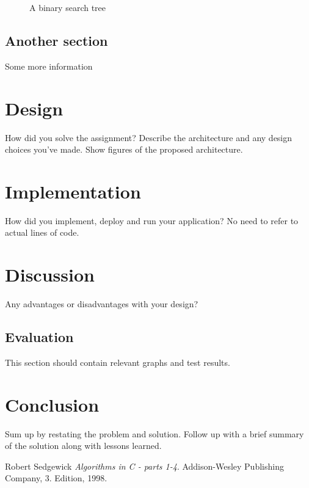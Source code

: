 \begin{figure}[h]
\begin{center}
\end{center}
\caption{A binary search tree}\label{fig:ackseq}
\end{figure}

\subsection{Another section}

Some more information

\section{Design}

How did you solve the assignment? Describe the architecture and any design choices you've made. Show figures of the proposed architecture.

\section{Implementation}

How did you implement, deploy and run your application? No need to refer to actual lines of code.

\section{Discussion}

Any advantages or disadvantages with your design?

\subsection{Evaluation}

This section should contain relevant graphs and test results.

\section{Conclusion}

Sum up by restating the problem and solution. Follow up with a brief summary of the solution along with lessons learned.



\newpage{}


\begin{thebibliography}{9}

 Robert Sedgewick 
  \emph{Algorithms in C - parts 1-4}.
  Addison-Wesley Publishing Company,
  3. Edition,
  1998.

\end{thebibliography}



